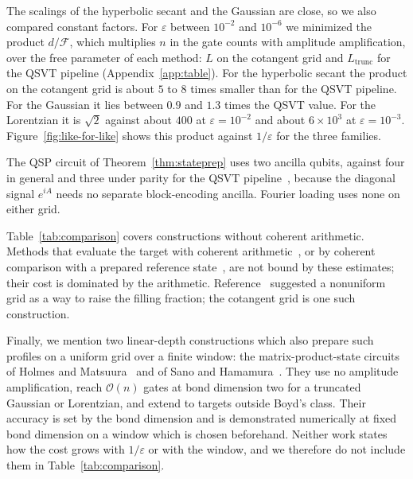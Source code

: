 The scalings of the hyperbolic secant and the Gaussian are close,
so we also compared constant factors.  For
$\varepsilon$ between $10^{-2}$ and $10^{-6}$ we minimized the
product $d/\mathcal{F}$, which multiplies $n$ in the gate counts
with amplitude amplification, over the free parameter of each method: $L$ on the cotangent grid
and $L_{\mathrm{trunc}}$ for the QSVT pipeline
(Appendix~\ref{app:table}).  For the hyperbolic secant the product
on the cotangent grid is about $5$ to $8$ times smaller than for the QSVT
pipeline.  For the Gaussian it lies between $0.9$ and $1.3$ times
the QSVT value.  For the Lorentzian it is $\sqrt2$ against about
$400$ at $\varepsilon=10^{-2}$ and about $6\times10^{3}$ at
$\varepsilon=10^{-3}$.  Figure~\ref{fig:like-for-like} shows this
product against $1/\varepsilon$ for the three families.

The QSP circuit of Theorem~\ref{thm:stateprep} uses two ancilla
qubits, against four in general and three under parity for the
QSVT pipeline~\cite{McArdleGilyenBerta2025}, because the diagonal
signal $e^{iA}$ needs no separate block-encoding ancilla.  Fourier
loading uses none on either grid.

Table~\ref{tab:comparison} covers constructions without coherent
arithmetic.  Methods that evaluate the target with coherent
arithmetic~\cite{GroverRudolph2002}, or by coherent comparison
with a prepared reference state~\cite{LemieuxEtAl2024}, are not
bound by these estimates; their cost is dominated by the
arithmetic.  Reference~\cite{RattewKoczor2022} suggested a
nonuniform grid as a way to raise the filling fraction; the
cotangent grid is one such construction.

Finally, we mention two linear-depth constructions which also
prepare such profiles on a uniform grid over a finite window: the
matrix-product-state
circuits of Holmes and Matsuura~\cite{HolmesMatsuura2020} and of
Sano and Hamamura~\cite{SanoHamamura2025}.  They use no amplitude
amplification, reach $\mathcal{O}(n)$ gates at bond dimension two
for a truncated Gaussian or Lorentzian, and extend to targets
outside Boyd's class.  Their accuracy is set by the bond dimension
and is demonstrated numerically at fixed bond dimension on a
window which is chosen beforehand.  Neither work states how the
cost grows with $1/\varepsilon$ or with the window, and we
therefore do not include them in Table~\ref{tab:comparison}.
